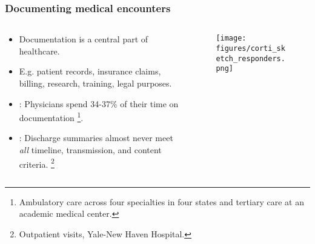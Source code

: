 \begin{frame}
    \frametitle{Documenting medical encounters}
    \begin{columns}
        \begin{column}{0.5\textwidth}
            \begin{itemize}
                \item <1-> Documentation is a central part of healthcare.
                \item <1-> E.g. patient records, insurance claims, billing, research, training, legal purposes.
                \vspace{1em}
                \item <2-> : Physicians spend 34-37\% of their time on documentation \cite{joukes_time_2018, tipping_where_2010, sinsky_allocation_2016}\footnote<2->{Ambulatory care across four specialties in four states and tertiary care at an academic medical center.}.
                \item <2-> : Discharge summaries almost never meet \emph{all} timeline, transmission, and content criteria. \cite{horwitz_comprehensive_2013}\footnote<2->{Outpatient visits, Yale-New Haven Hospital.}
            \end{itemize}
        \end{column}
        \begin{column}{0.5\textwidth}
            \begin{figure}
                \centering
                \texttt{[image: figures/corti\_sketch\_responders.png]}
            \end{figure}
        \end{column}
    \end{columns}

\end{frame}


